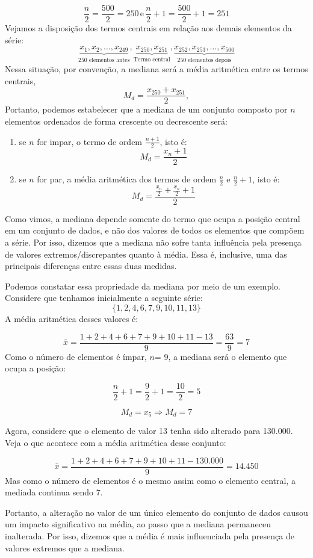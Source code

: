 \[
    \frac{n}{2}=\frac{500}{2}=250\,\text{e}\,\frac{n}{2}+1=\frac{500}{2}+1=251
\]
Vejamos a disposição dos termos centrais em relação aos demais elementos da série:
\[
    \underbrace{x_1, x_2, \dots, x_{249}}_{\text{250 elementos antes}}, \underbrace{x_{250}, x_{251}}_{\text{Termo central}}, \underbrace{ x_{252}, x_{253}, \dots, x_{500}}_{\text{250 elementos depois}}
\]
Nessa situação, por convenção, a mediana será a média aritmética entre os termos centrais,
\[
    M_d=\frac{x_{250}+x_{251}}{2},
\]
Portanto, podemos estabelecer que a mediana de um conjunto composto por \(n\)elementos ordenados de forma crescente ou decrescente será:
\begin{enumerate}[label=\alph *.]
    \item se \(n\) for impar, o termo de ordem \(\frac{n+1}{2}\), isto é:
    \[
        M_d=\frac{x_n+1}{2}
    \]
    \item se \(n\) for par, a média aritmética dos termos de ordem \(\frac{n}{2}\) e \(\frac{n}{2}+1\), isto é:
    \[
        M_d=\frac{\frac{x_n}{2}+\frac{x_n}{2}+1}{2}
    \]
\end{enumerate}
Como vimos, a mediana depende somente do termo que ocupa a posição central em um conjunto de dados, e não dos valores de todos os elementos que compõem a série. Por isso, dizemos que a mediana não sofre tanta influência pela presença de valores extremos/discrepantes quanto à média. Essa é, inclusive, uma das principais diferenças entre essas duas medidas.

Podemos constatar essa propriedade da mediana por meio de um exemplo. Considere que tenhamos inicialmente a seguinte série:
\[
    \{1, 2, 4, 6, 7, 9, 10, 11, 13\}
\]
A média aritmética desses valores é:

\[
    \bar{x}=\frac{1+2+4+6+7+9+10+11-13}{9}=\frac{63}{9}=7
\]
Como o número de elementos é ímpar, \(n\)= 9, a mediana será o elemento que ocupa a posição:

\[
    \frac{n}{2}+1=\frac{9}{2}+1=\frac{10}{2}=5
\]

\[
    M_d=x_5\Rightarrow M_d=7
\]

Agora, considere que o elemento de valor 13 tenha sido alterado para 130.000. Veja o que acontece com a média aritmética desse conjunto:

\[
    \bar{x}=\frac{1+2+4+6+7+9+10+11-130.000}{9}=14.450
\]
Mas como o número de elementos é o mesmo assim como o elemento central, a mediada continua sendo 7.

Portanto, a alteração no valor de um único elemento do conjunto de dados causou um impacto significativo na média, ao passo que a mediana permaneceu inalterada. Por isso, dizemos que a média é mais influenciada pela presença de valores extremos que a mediana.

